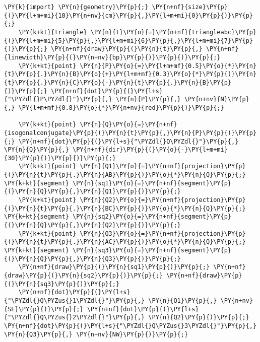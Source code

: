\begin{Verbatim}[commandchars=\\\{\}]
    \PY{k}{import} \PY{n}{geometry}\PY{p}{;} \PY{n+nf}{size}\PY{p}{(}\PY{l+m+mi}{10}\PY{n+nv}{cm}\PY{p}{,}\PY{l+m+mi}{0}\PY{p}{)}\PY{p}{;}
    \PY{k+kt}{triangle} \PY{n}{t}\PY{o}{=}\PY{n+nf}{triangleabc}\PY{p}{(}\PY{l+m+mi}{5}\PY{p}{,}\PY{l+m+mi}{6}\PY{p}{,}\PY{l+m+mi}{7}\PY{p}{)}\PY{p}{;} \PY{n+nf}{draw}\PY{p}{(}\PY{n}{t}\PY{p}{,} \PY{n+nf}{linewidth}\PY{p}{(}\PY{n+nv}{bp}\PY{p}{)}\PY{p}{)}\PY{p}{;}
    \PY{k+kt}{point} \PY{n}{P}\PY{o}{=}\PY{l+m+mf}{0.5}\PY{o}{*}\PY{n}{t}\PY{p}{.}\PY{n}{B}\PY{o}{+}\PY{l+m+mf}{0.3}\PY{o}{*}\PY{p}{(}\PY{n}{t}\PY{p}{.}\PY{n}{C}\PY{o}{-}\PY{n}{t}\PY{p}{.}\PY{n}{B}\PY{p}{)}\PY{p}{;} \PY{n+nf}{dot}\PY{p}{(}\PY{l+s}{"\PYZdl{}P\PYZdl{}"}\PY{p}{,} \PY{n}{P}\PY{p}{,} \PY{n+nv}{N}\PY{p}{,} \PY{l+m+mf}{0.8}\PY{o}{*}\PY{n+nv}{red}\PY{p}{)}\PY{p}{;}

    \PY{k+kt}{point} \PY{n}{Q}\PY{o}{=}\PY{n+nf}{isogonalconjugate}\PY{p}{(}\PY{n}{t}\PY{p}{,}\PY{n}{P}\PY{p}{)}\PY{p}{;} \PY{n+nf}{dot}\PY{p}{(}\PY{l+s}{"\PYZdl{}Q\PYZdl{}"}\PY{p}{,} \PY{n}{Q}\PY{p}{,} \PY{n+nf}{dir}\PY{p}{(}\PY{o}{-}\PY{l+m+mi}{30}\PY{p}{)}\PY{p}{)}\PY{p}{;}
    \PY{k+kt}{point} \PY{n}{Q1}\PY{o}{=}\PY{n+nf}{projection}\PY{p}{(}\PY{n}{t}\PY{p}{.}\PY{n}{AB}\PY{p}{)}\PY{o}{*}\PY{n}{Q}\PY{p}{;} \PY{k+kt}{segment} \PY{n}{sq1}\PY{o}{=}\PY{n+nf}{segment}\PY{p}{(}\PY{n}{Q}\PY{p}{,}\PY{n}{Q1}\PY{p}{)}\PY{p}{;}
    \PY{k+kt}{point} \PY{n}{Q2}\PY{o}{=}\PY{n+nf}{projection}\PY{p}{(}\PY{n}{t}\PY{p}{.}\PY{n}{BC}\PY{p}{)}\PY{o}{*}\PY{n}{Q}\PY{p}{;} \PY{k+kt}{segment} \PY{n}{sq2}\PY{o}{=}\PY{n+nf}{segment}\PY{p}{(}\PY{n}{Q}\PY{p}{,}\PY{n}{Q2}\PY{p}{)}\PY{p}{;}
    \PY{k+kt}{point} \PY{n}{Q3}\PY{o}{=}\PY{n+nf}{projection}\PY{p}{(}\PY{n}{t}\PY{p}{.}\PY{n}{AC}\PY{p}{)}\PY{o}{*}\PY{n}{Q}\PY{p}{;} \PY{k+kt}{segment} \PY{n}{sq3}\PY{o}{=}\PY{n+nf}{segment}\PY{p}{(}\PY{n}{Q}\PY{p}{,}\PY{n}{Q3}\PY{p}{)}\PY{p}{;}
    \PY{n+nf}{draw}\PY{p}{(}\PY{n}{sq1}\PY{p}{)}\PY{p}{;} \PY{n+nf}{draw}\PY{p}{(}\PY{n}{sq2}\PY{p}{)}\PY{p}{;} \PY{n+nf}{draw}\PY{p}{(}\PY{n}{sq3}\PY{p}{)}\PY{p}{;}
    \PY{n+nf}{dot}\PY{p}{(}\PY{l+s}{"\PYZdl{}Q\PYZus{}1\PYZdl{}"}\PY{p}{,} \PY{n}{Q1}\PY{p}{,} \PY{n+nv}{SE}\PY{p}{)}\PY{p}{;} \PY{n+nf}{dot}\PY{p}{(}\PY{l+s}{"\PYZdl{}Q\PYZus{}2\PYZdl{}"}\PY{p}{,} \PY{n}{Q2}\PY{p}{)}\PY{p}{;} \PY{n+nf}{dot}\PY{p}{(}\PY{l+s}{"\PYZdl{}Q\PYZus{}3\PYZdl{}"}\PY{p}{,} \PY{n}{Q3}\PY{p}{,} \PY{n+nv}{NW}\PY{p}{)}\PY{p}{;}


\end{Verbatim}
